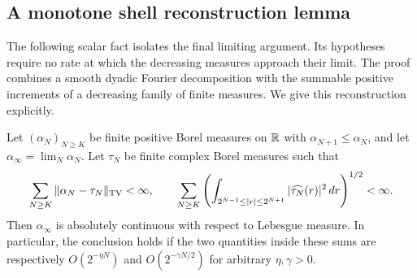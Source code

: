 \subsection{A monotone shell reconstruction lemma}

The following scalar fact isolates the final limiting argument.  Its
hypotheses require no rate at which the decreasing measures approach
their limit.  The proof combines a smooth dyadic Fourier decomposition
with the summable positive increments of a decreasing family of finite
measures. We give this reconstruction explicitly.

\begin{lemma}\label{asm:monotone-shell}
Let $(\alpha_N)_{N\ge K}$ be finite positive Borel measures on $\mathbb R$
with $\alpha_{N+1}\le\alpha_N$, and let
$\alpha_\infty=\lim_N\alpha_N$.  Let $\tau_N$ be finite complex
Borel measures such that
\begin{equation}
 \label{asm:criterion-hypotheses}
 \sum_{N\ge K}\|\alpha_N-\tau_N\|_{\mathrm{TV}}<\infty,
 \qquad
 \sum_{N\ge K}
 \left(\int_{2^{N-1}\le |r|\le2^{N+1}}
                   |\widehat{\tau_N}(r)|^2\,dr\right)^{1/2}<\infty.
\end{equation}
Then $\alpha_\infty$ is absolutely continuous with respect to
Lebesgue measure.  In particular, the conclusion holds if the two
quantities inside these sums are respectively
$O(2^{-\eta N})$ and $O(2^{-\gamma N/2})$ for arbitrary
$\eta,\gamma>0$.
\end{lemma}

